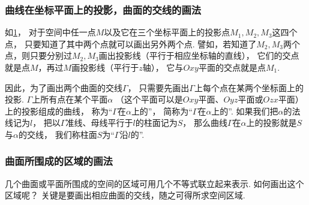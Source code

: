 \subsubsection{曲线在坐标平面上的投影，曲面的交线的画法}
如\cref{figure:解析几何.点在坐标平面上的投影}，
对于空间中任一点\(M\)以及它在三个坐标平面上的投影点\(M_1,M_2,M_3\)这四个点，
只要知道了其中两个点就可以画出另外两个点.
譬如，若知道了\(M_2,M_3\)两个点，则只要分别过\(M_2,M_3\)画出投影线（平行于相应坐标轴的直线），
它们的交点就是点\(M\)，再过\(M\)画投影线（平行于\(z\)轴），
它与\(Oxy\)平面的交点就是点\(M_1\).

\begin{figure}[ht]
	\centering
	\caption{}
	\label{figure:解析几何.点在坐标平面上的投影}
\end{figure}

因此，为了画出两个曲面的交线\(\Gamma\)，
只需要先画出\(\Gamma\)上每个点在某两个坐标面上的投影.
\(\Gamma\)上所有点在某个平面\(\alpha\)
（这个平面可以是\(Oxy\)平面、\(Oyz\)平面或\(Ozx\)平面）
上的投影组成的曲线，
称为“\(\Gamma\)在\(\alpha\)上的”，
简称为“\(\Gamma\)在\(\alpha\)上的”.
如果我们把\(\alpha\)的法线记为\(l\)，
把以\(\Gamma\)准线、母线平行于\(l\)的柱面记为\(S\)，
那么曲线\(\Gamma\)在\(\alpha\)上的投影就是\(S\)与\(\alpha\)的交线，
我们称柱面\(S\)为“\(\Gamma\)沿\(l\)的”.

\subsubsection{曲面所围成的区域的画法}
几个曲面或平面所围成的空间的区域可用几个不等式联立起来表示.
如何画出这个区域呢？
关键是要画出相应曲面的交线，随之可得所求空间区域.

